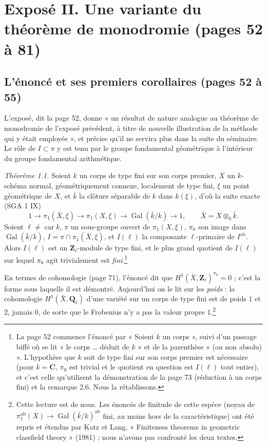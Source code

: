 \documentclass[11pt,a4paper]{article}
\begin{document}
\section*{Exposé II. Une variante du théorème de monodromie (pages 52 à 81)}

\subsection*{L'énoncé et ses premiers corollaires (pages 52 à 55)}

L'exposé, dit la page 52, donne « un résultat de nature analogue au théorème de
monodromie de l'exposé précédent, à titre de nouvelle illustration de la méthode
qui y était employée », et précise qu'il ne servira plus dans la suite du
séminaire. Le rôle de $I \subset \pi$ y est tenu par le groupe fondamental
géométrique à l'intérieur du groupe fondamental arithmétique.

\emph{Théorème 1.1.} Soient $k$ un corps de type fini sur son corps premier,
$X$ un $k$-schéma normal, géométriquement connexe, localement de type fini,
$\xi$ un point géométrique de $X$, et $\bar k$ la clôture séparable de $k$ dans
$k(\xi)$, d'où la suite exacte (SGA 1 IX)
\[
  1 \to \pi_1(\bar X, \xi) \to \pi_1(X, \xi) \to \operatorname{Gal}(\bar k/k) \to 1,
  \qquad \bar X = X \otimes_k \bar k .
\]
Soient $\ell \neq \operatorname{car} k$, $\pi$ un sous-groupe ouvert de
$\pi_1(X,\xi)$, $\pi_0$ son image dans $\operatorname{Gal}(\bar k/k)$,
$I = \pi \cap \pi_1(\bar X, \xi)$, et $I(\ell)$ la composante $\ell$-primaire de
$I^{\mathrm{ab}}$. Alors $I(\ell)$ est un $\mathbf{Z}_\ell$-module de type fini,
et le plus grand quotient de $I(\ell)$ sur lequel $\pi_0$ agit trivialement est
\emph{fini}.\footnote{La page 52 commence l'énoncé par « Soient $k$ un corps »,
suivi d'un passage biffé où se lit « le corps \ldots{} déduit de $k$ » et de la
parenthèse « (ou non absolu) ». L'hypothèse que $k$ soit de type fini sur son
corps premier est nécessaire (pour $k = \mathbf{C}$, $\pi_0$ est trivial et le
quotient en question est $I(\ell)$ tout entier), et c'est celle qu'utilisent
la démonstration de la page 73 (réduction à un corps fini) et la remarque 2.6.
Nous la rétablissons.}

En termes de cohomologie (page 71), l'énoncé dit que
$H^1(\bar X, \mathbf{Z}_\ell)^{\pi_0} = 0$ ; c'est la forme sous laquelle il est
démontré. Aujourd'hui on le lit sur les \emph{poids} : la cohomologie
$H^1(\bar X, \mathbf{Q}_\ell)$ d'une variété sur un corps de type fini est de
poids $1$ et $2$, jamais $0$, de sorte que le Frobenius n'y a pas la valeur propre
$1$.\footnote{Cette lecture est de nous. Les énoncés de finitude de cette espèce
(noyau de $\pi_1^{\mathrm{ab}}(X) \to \operatorname{Gal}(\bar k/k)^{\mathrm{ab}}$
fini, au moins hors de la caractéristique) ont été repris et étendus par Katz
et Lang, « Finiteness theorems in geometric classfield theory » (1981) ; nous
n'avons pas confronté les deux textes.}
\end{document}
